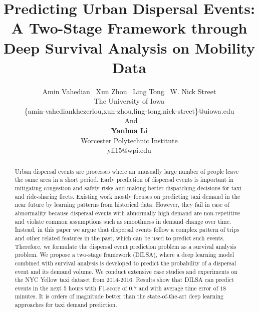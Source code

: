 \documentclass[letterpaper]{article} %
\begin{document}
\title{Predicting Urban Dispersal Events: A Two-Stage Framework through Deep Survival Analysis on Mobility Data}
\author{Amin Vahedian \ Xun Zhou \ Ling Tong \ W. Nick Street\\
The University of Iowa\\
\{amin-vahediankhezerlou,xun-zhou,ling-tong,nick-street\}@uiowa.edu\\
\ And\\
\textbf{Yanhua Li}\\
Worcester Polytechnic Institute\\
yli15@wpi.edu
}
\maketitle
\begin{abstract}
Urban dispersal events are processes where an unusually large number of people leave the same area in a short period. Early prediction of dispersal events is important in mitigating congestion and safety risks and making better dispatching decisions for taxi and ride-sharing fleets. %
Existing work mostly focuses on predicting taxi demand in the near future by learning patterns from historical data. However, they fail in case of abnormality because dispersal events with abnormally high demand are non-repetitive and violate common assumptions such as smoothness in demand change over time.
Instead, in this paper we argue that dispersal events follow a complex pattern of trips and other related features in the past, which can be used to predict such events. Therefore, we formulate the dispersal event prediction problem as a survival analysis problem. We propose a two-stage framework (DILSA), where a deep learning model combined with survival analysis is developed to predict the probability of a dispersal event and its demand volume. We conduct extensive case studies and experiments on the NYC Yellow taxi dataset from 2014-2016. Results show that DILSA can predict events in the next 5 hours with F1-score of $0.7$ and with average time error of $18$ minutes. It is orders of magnitude better than the state-of-the-art deep learning approaches for taxi demand prediction.
\end{abstract}
\end{document}
